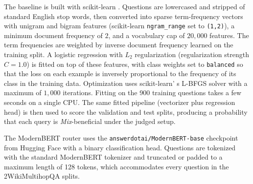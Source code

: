 \documentclass[english, bibtex]{kththesis}               %
\numberwithin{listing}{chapter}
\providecommand{\DIFdeltex}[1]{{\protect\color{red} \scriptsize #1}} %
\providecommand{\DIFdel}[1]{\texorpdfstring{\DIFdeltex{#1}}{}} %
\begin{document}
\DIFdel{The baseline is built with scikit-learn \cite{pedregosa2011scikit}. Questions are lowercased and stripped of standard English stop words, then converted into sparse term-frequency vectors with unigram and bigram features (scikit-learn \texttt{ngram\_range} set to \texttt{(1,2)}), a minimum document frequency of $2$, and a vocabulary cap of $20{,}000$ features. The term frequencies are weighted by inverse document frequency \cite{salton1988termweighting} learned on the training split. A logistic regression with $L_2$ regularization (regularization strength $C=1.0$) is fitted on top of these features, with class weights set to \texttt{balanced} so that the loss on each example is inversely proportional to the frequency of its class in the training data. Optimization uses scikit-learn' s L-BFGS solver \cite{liu1989limited} with a maximum of $1{,}000$ iterations. Fitting on the 900 training questions takes a few seconds on a single CPU. The same fitted pipeline (vectorizer plus regression head) is then used to score the validation and test splits, producing a probability that each query is \emph{Mix}-beneficial under the judged setup. }%


\DIFdel{The ModernBERT router uses the \texttt{answerdotai/ModernBERT-base} checkpoint from Hugging Face \cite{warner2024modernbert} with a binary classification head.
Questions are tokenized with the standard ModernBERT tokenizer and truncated or padded to a maximum length of 128 tokens, which accommodates every question in the 2WikiMultihopQA splits. }%
\end{document}
